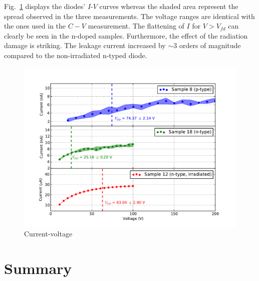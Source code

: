 \documentclass[11pt]{article}
\begin{document}
Fig.~\ref{fig:iv} displays the diodes' $I$-$V$ curves whereas the shaded area represent the spread observed in the three measurements.
The voltage ranges are identical with the ones used in the $C-V$ measurement.
The flattening of $I$ for $V>V_{fd}$ can clearly be seen in the n-doped samples.
Furthermore, the effect of the radiation damage is striking.
The leakage current increased by $\sim 3$ orders of magnitude compared to the non-irradiated n-typed diode.

\begin{figure}
  \centering
  \includegraphics[width=\textwidth]{./figures/iv.pdf}
  \caption{Current-voltage}
  \label{fig:iv}
\end{figure}

\section{Summary}
\label{sec:summary}



\printbibliography
\end{document}

